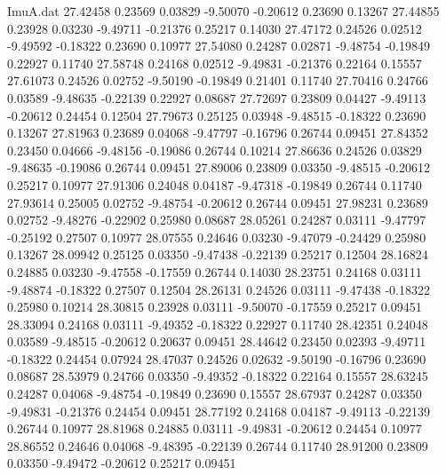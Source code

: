 \begin{filecontents}{ImuA.dat}
  27.42458    0.23569    0.03829   -9.50070   -0.20612    0.23690    0.13267
  27.44855    0.23928    0.03230   -9.49711   -0.21376    0.25217    0.14030
  27.47172    0.24526    0.02512   -9.49592   -0.18322    0.23690    0.10977
  27.54080    0.24287    0.02871   -9.48754   -0.19849    0.22927    0.11740
  27.58748    0.24168    0.02512   -9.49831   -0.21376    0.22164    0.15557
  27.61073    0.24526    0.02752   -9.50190   -0.19849    0.21401    0.11740
  27.70416    0.24766    0.03589   -9.48635   -0.22139    0.22927    0.08687
  27.72697    0.23809    0.04427   -9.49113   -0.20612    0.24454    0.12504
  27.79673    0.25125    0.03948   -9.48515   -0.18322    0.23690    0.13267
  27.81963    0.23689    0.04068   -9.47797   -0.16796    0.26744    0.09451
  27.84352    0.23450    0.04666   -9.48156   -0.19086    0.26744    0.10214
  27.86636    0.24526    0.03829   -9.48635   -0.19086    0.26744    0.09451
  27.89006    0.23809    0.03350   -9.48515   -0.20612    0.25217    0.10977
  27.91306    0.24048    0.04187   -9.47318   -0.19849    0.26744    0.11740
  27.93614    0.25005    0.02752   -9.48754   -0.20612    0.26744    0.09451
  27.98231    0.23689    0.02752   -9.48276   -0.22902    0.25980    0.08687
  28.05261    0.24287    0.03111   -9.47797   -0.25192    0.27507    0.10977
  28.07555    0.24646    0.03230   -9.47079   -0.24429    0.25980    0.13267
  28.09942    0.25125    0.03350   -9.47438   -0.22139    0.25217    0.12504
  28.16824    0.24885    0.03230   -9.47558   -0.17559    0.26744    0.14030
  28.23751    0.24168    0.03111   -9.48874   -0.18322    0.27507    0.12504
  28.26131    0.24526    0.03111   -9.47438   -0.18322    0.25980    0.10214
  28.30815    0.23928    0.03111   -9.50070   -0.17559    0.25217    0.09451
  28.33094    0.24168    0.03111   -9.49352   -0.18322    0.22927    0.11740
  28.42351    0.24048    0.03589   -9.48515   -0.20612    0.20637    0.09451
  28.44642    0.23450    0.02393   -9.49711   -0.18322    0.24454    0.07924
  28.47037    0.24526    0.02632   -9.50190   -0.16796    0.23690    0.08687
  28.53979    0.24766    0.03350   -9.49352   -0.18322    0.22164    0.15557
  28.63245    0.24287    0.04068   -9.48754   -0.19849    0.23690    0.15557
  28.67937    0.24287    0.03350   -9.49831   -0.21376    0.24454    0.09451
  28.77192    0.24168    0.04187   -9.49113   -0.22139    0.26744    0.10977
  28.81968    0.24885    0.03111   -9.49831   -0.20612    0.24454    0.10977
  28.86552    0.24646    0.04068   -9.48395   -0.22139    0.26744    0.11740
  28.91200    0.23809    0.03350   -9.49472   -0.20612    0.25217    0.09451

\end{filecontents}
